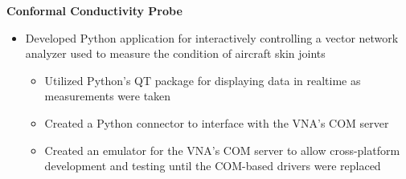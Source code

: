 \documentclass[a4paper]{article}
\begin{document}
\noindent
\hspace{0.120in}
\textbf{Conformal Conductivity Probe}
\smallskip

\begin{itemize}
  \item Developed Python application for interactively controlling a vector network
    analyzer used to measure the condition of aircraft skin joints
  \begin{itemize}
    \item Utilized Python's QT package for displaying data in realtime as measurements
      were taken
    \item Created a Python connector to interface with the VNA's COM server
    \item Created an emulator for the VNA's COM server to allow cross-platform
      development and testing until the COM-based drivers were replaced
  \end{itemize}
\end{itemize}

\end{document}
